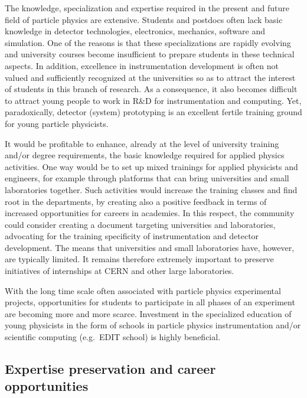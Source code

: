 The knowledge, specialization and expertise required in the present and future field of particle physics are extensive.  Students and postdocs often lack basic knowledge in detector technologies, electronics, mechanics, software and simulation.  One of the reasons is that these specializations are rapidly evolving and university courses become insufficient to prepare students in these technical aspects.  
In addition, excellence in instrumentation development is often not valued and sufficiently recognized at the universities so as to attract the interest of students in this branch of research.
As a consequence, it also becomes difficult to attract young people to work in R\&D for instrumentation and computing. Yet, paradoxically, detector (system) prototyping is an excellent fertile training ground for young particle physicists.

It would be profitable to enhance, already at the level of university training and/or degree requirements, the basic knowledge required for applied physics activities.
One way would be to set up mixed trainings for applied physicists and engineers, for example through platforms that can bring universities and small laboratories together. Such activities would increase the training classes and find root in the departments, by creating also a positive feedback in terms of increased opportunities for careers in academies. 
In this respect, the community could consider creating a document targeting universities and laboratories, advocating for the training specificity of instrumentation and detector development.
The means that universities and small laboratories have, however, are typically limited. It remains therefore extremely important to preserve initiatives of internships at CERN and other large laboratories.

With the long time scale often associated with particle physics experimental projects, opportunities for students to participate in all phases of an experiment are becoming more and more scarce.  Investment in the specialized education of young physicists in the form of schools in particle physics instrumentation and/or scientific computing (e.g.\ EDIT school) is highly beneficial.


\subsection{Expertise preservation and career opportunities}

